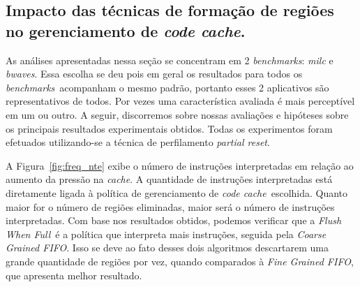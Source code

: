 \documentclass[12pt,twoside]{article}
\newcommand{\ccache}{\emph{code cache}}
\newcommand{\cache}{\emph{cache}}
\newcommand{\benchmarks}{\emph{benchmarks}}
\newcommand{\flush}{\emph{Flush When Full}}
\newcommand{\finefifo}{\emph{Fine Grained FIFO}}
\newcommand{\coarsefifo}{\emph{Coarse Grained FIFO}}
\begin{document}
\subsection{Impacto das técnicas de formação de regiões no gerenciamento de \ccache.}
As análises apresentadas nessa seção se concentram em 2 \benchmarks: \emph{milc} e \emph{bwaves}. Essa escolha se deu pois em geral os resultados para todos os \benchmarks~acompanham o mesmo padrão, portanto esses 2 aplicativos são representativos de todos. Por vezes uma característica avaliada é mais perceptível em um ou outro. A seguir, discorremos sobre nossas avaliações e hipóteses sobre os principais resultados experimentais obtidos. Todas os experimentos foram efetuados utilizando-se a técnica de perfilamento \emph{partial reset}.

A Figura~\ref{fig:freq_nte} exibe o número de instruções interpretadas em relação ao aumento da pressão na \cache. A quantidade de instruções interpretadas está diretamente ligada à política de gerenciamento de \ccache~escolhida. Quanto maior for o número de regiões eliminadas, maior será o número de instruções interpretadas. Com base nos resultados obtidos, podemos verificar que a \flush~é a política que interpreta mais instruções, seguida pela \coarsefifo. Isso se deve ao fato desses dois algoritmos descartarem uma grande quantidade de regiões por vez, quando comparados à \finefifo, que apresenta melhor resultado.
\end{document}
